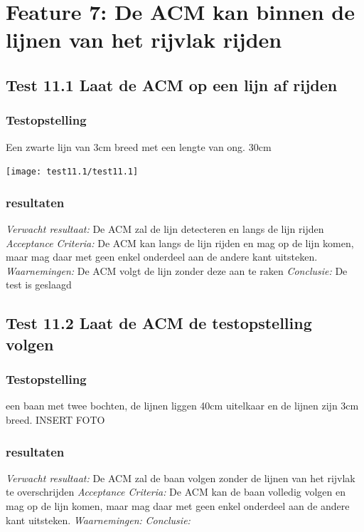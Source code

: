 \documentclass{article}
\begin{document}
\section{Feature 7: De ACM kan binnen de lijnen van het rijvlak rijden}
\subsection{Test 11.1 Laat de ACM op een lijn af rijden}
\subsubsection{Testopstelling}
Een zwarte lijn van 3cm breed met een lengte van ong. 30cm \\
\begin{center}
  \texttt{[image: test11.1/test11.1]}
\end{center}
\subsubsection{resultaten}
\textit{Verwacht resultaat: }De ACM zal de lijn detecteren en langs de lijn rijden
\newline
\textit{Acceptance Criteria: }De ACM kan langs de lijn rijden en mag op de lijn komen, maar mag daar met geen enkel onderdeel aan de andere kant uitsteken.
\newline
\textit{Waarnemingen: }De ACM volgt de lijn zonder deze aan te raken
\newline
\textit{Conclusie: }De test is geslaagd

\subsection{Test 11.2 Laat de ACM de testopstelling volgen}
\subsubsection{Testopstelling}
een baan met twee bochten, de lijnen liggen 40cm uitelkaar en de lijnen zijn 3cm breed.
INSERT FOTO
\subsubsection{resultaten}
\textit{Verwacht resultaat: }De ACM zal de baan volgen zonder de lijnen van het rijvlak te overschrijden
\newline
\textit{Acceptance Criteria: }De ACM kan de baan volledig volgen en mag op de lijn komen, maar mag daar met geen enkel onderdeel aan de andere kant uitsteken.
\newline
\textit{Waarnemingen: }
\newline
\textit{Conclusie: }
\end{document}
